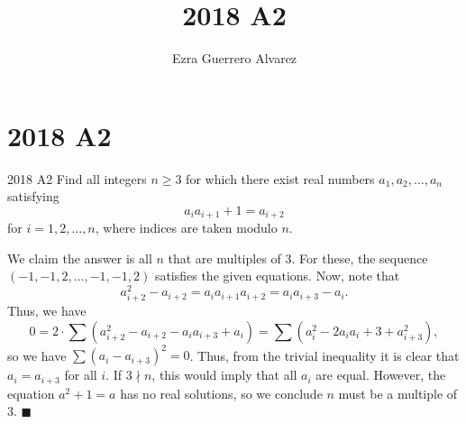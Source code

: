 \documentclass[14pt]{article}
\title{2018 A2}
\author{Ezra Guerrero Alvarez}
\begin{document}
\maketitle
	
\section*{2018 A2}

\begin{statement}{2018 A2}
	Find all integers $n \geq 3$ for which
	there exist real numbers $a_1, a_2, \dots, a_n$ satisfying
	\[ a_i a_{i+1} +1 = a_{i+2} \]
	for $i=1,2, \dots, n$, where indices are taken modulo $n$.
\end{statement}
We claim the answer is all $n$ that are multiples of $3$. For these, the sequence $(-1,-1,2,\ldots,-1,-1,2)$ satisfies the given equations. Now, note that
\[ a_{i+2}^2-a_{i+2} = a_ia_{i+1}a_{i+2} = a_ia_{i+3}-a_i. \]
Thus, we have 
\[ 0 = 2\cdot\sum (a_{i+2}^2-a_{i+2}-a_ia_{i+3}+a_i)= \sum (a_i^2-2a_ia_i+3+a_{i+3}^2), \]
so we have $\sum (a_i-a_{i+3})^2 = 0$. Thus, from the trivial inequality it is clear that $a_i=a_{i+3}$ for all $i$. If $3\nmid n$, this would imply that all $a_i$ are equal. However, the equation $a^2+1=a$ has no real solutions, so we conclude $n$ must be a multiple of $3$. $\blacksquare$
	
\end{document}
